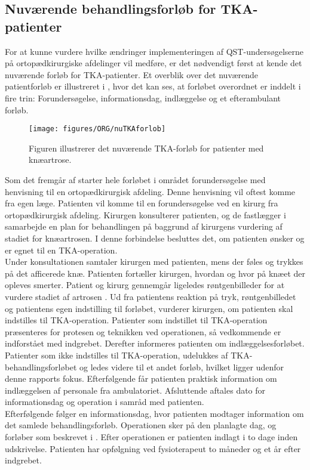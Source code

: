 \subsection{Nuværende behandlingsforløb for TKA-patienter}
For at kunne vurdere hvilke ændringer implementeringen af QST-undersøgelserne på ortopædkirurgiske afdelinger vil medføre, er det nødvendigt først at kende det nuværende forløb for TKA-patienter. Et overblik over det nuværende patientforløb er illustreret i , hvor det kan ses, at forløbet overordnet er inddelt i fire trin: Forundersøgelse, informationsdag, indlæggelse og et efterambulant forløb. 


\begin{figure}[H]
	\centering
	\texttt{[image: figures/ORG/nuTKAforlob]}
\caption{Figuren illustrerer det nuværende TKA-forløb for patienter med knæartrose.}
\label{nuTKAforlob}
	\flushleft
\end{figure}


Som det fremgår af  starter hele forløbet i området forundersøgelse med henvisning til en ortopædkirurgisk afdeling. Denne henvisning vil oftest komme fra egen læge. Patienten vil komme til en forundersøgelse ved en kirurg fra ortopædkirurgisk afdeling. Kirurgen konsulterer patienten, og de fastlægger i samarbejde en plan for behandlingen på baggrund af kirurgens vurdering af stadiet for knæartrosen. I denne forbindelse besluttes det, om patienten ønsker og er egnet til en TKA-operation. \\
Under konsultationen samtaler kirurgen med patienten, mens der føles og trykkes på det afficerede knæ. Patienten fortæller kirurgen, hvordan og hvor på knæet der opleves smerter. Patient og kirurg gennemgår ligeledes røntgenbilleder for at vurdere stadiet af artrosen \citep{pritka2015}.
Ud fra patientens reaktion på tryk, røntgenbilledet og patientens egen indstilling til forløbet, vurderer kirurgen, om patienten skal indstilles til TKA-operation. Patienter som indstillet til TKA-operation præsenteres for protesen og teknikken ved operationen, så vedkommende er indforstået med indgrebet. Derefter informeres patienten om indlæggelsesforløbet. Patienter som ikke indstilles til TKA-operation, udelukkes af TKA-behandlingsforløbet og ledes videre til et andet forløb, hvilket ligger udenfor denne rapports fokus.
Efterfølgende får patienten praktisk information om indlæggelsen af personale fra ambulatoriet. Afsluttende aftales dato for informationsdag og operation i samråd med patienten. \citep{pritka2015} \\
Efterfølgende følger en informationsdag, hvor patienten modtager information om det samlede behandlingsforløb. Operationen sker på den planlagte dag, og forløber som beskrevet i . Efter operationen er patienten indlagt i to dage inden udskrivelse. Patienten har opfølgning ved fysioterapeut to måneder og et år efter indgrebet. \citep{pritka2015} 


